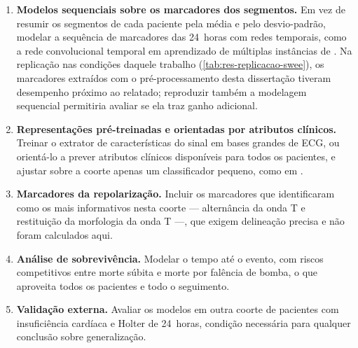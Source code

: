 \begin{enumerate}
    \item \textbf{Modelos sequenciais sobre os marcadores dos segmentos.}
          Em vez de resumir os segmentos de cada paciente pela média e pelo
          desvio-padrão, modelar a sequência de marcadores das 24~horas com
          redes temporais, como a rede convolucional temporal em aprendizado
          de múltiplas instâncias de . Na
          replicação nas condições daquele trabalho
          (\autoref{tab:res-replicacao-swee}), os marcadores extraídos com
          o pré-processamento desta dissertação tiveram desempenho próximo
          ao relatado; reproduzir também a modelagem sequencial permitiria
          avaliar se ela traz ganho adicional.

    \item \textbf{Representações pré-treinadas e orientadas por atributos
          clínicos.} Treinar o extrator de características do sinal em bases
          grandes de \gls{ECG}, ou orientá-lo a prever atributos clínicos
          disponíveis para todos os pacientes, e ajustar sobre a coorte
          apenas um classificador pequeno, como em .

    \item \textbf{Marcadores da repolarização.} Incluir os marcadores que
           identificaram como os mais informativos
          nesta coorte --- alternância da onda T e restituição da morfologia da
          onda T ---, que exigem delineação precisa e não foram calculados aqui.

    \item \textbf{Análise de sobrevivência.} Modelar o tempo até o evento,
          com riscos competitivos entre morte súbita e morte por falência de
          bomba, o que aproveita todos os pacientes e todo o seguimento.

    \item \textbf{Validação externa.} Avaliar os modelos em outra coorte de
          pacientes com insuficiência cardíaca e Holter de 24~horas, condição
          necessária para qualquer conclusão sobre generalização.
\end{enumerate}
